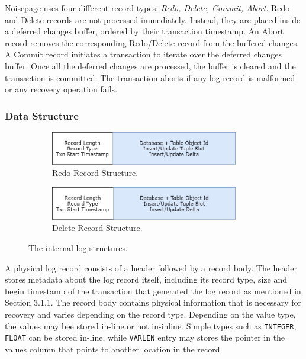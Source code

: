 \documentclass[12pt]{cmuthesis}
\begin{document}
Noisepage uses four different record types: \textit{Redo, Delete, Commit, Abort}. Redo and Delete records are not processed immediately. Instead, they are placed inside a deferred changes buffer, ordered by their transaction timestamp. An Abort record removes the corresponding Redo/Delete record from the buffered changes. A Commit record initiates a transaction to iterate over the deferred changes buffer. Once all the deferred changes are processed, the buffer is cleared and the transaction is committed. The transaction aborts if any log record is malformed or any recovery operation fails.

\subsubsection{Data Structure}
\begin{figure}[H]
\centering
\begin{subfigure}{.5\textwidth}
 \centering
 \includegraphics[width=0.9\textwidth]{images/RedoRecord.png}
 \caption{Redo Record Structure.}
  \label{fig:pipeline_graph}
\end{subfigure}%
\begin{subfigure}{.5\textwidth}
 \centering
 \includegraphics[width=0.9\textwidth]{images/DeleteRecord.png}
 \caption{Delete Record Structure.}
  \label{fig:pipeline_code}
\end{subfigure}
\caption{The internal log structures.}
\label{fig:log_record}
\end{figure}

A physical log record consists of a header followed by a record body. The header stores metadata about the log record itself, including its record type, size and begin timestamp of the transaction that generated the log record as mentioned in Section 3.1.1. The record body contains physical information that is necessary for recovery and varies depending on the record type. Depending on the value type, the values may bee stored in-line or not in-inline. Simple types such as \texttt{INTEGER}, \texttt{FLOAT} can be stored in-line, while \texttt{VARLEN} entry may stores the pointer in the values column that points to another location in the record.
\end{document}
